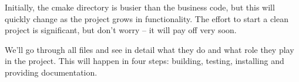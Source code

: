 Initially, the cmake directory is busier than the business code, but this will quickly change as the project grows in functionality. The effort to start a clean project is significant, but don't worry – it will pay off very soon.

We'll go through all files and see in detail what they do and what role they play in the project. This will happen in four steps: building, testing, installing and providing documentation.















